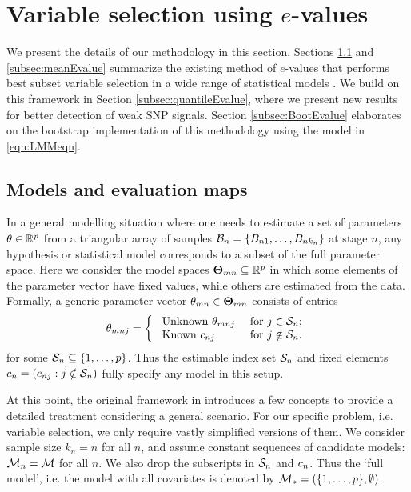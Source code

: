 \section{Variable selection using $e$-values}
\label{sec:methodsSection}
We present the details of our methodology in this section. Sections \ref{subsec:DefineModel} and \ref{subsec:meanEvalue} summarize the existing method of $e$-values that performs best subset variable selection in a wide range of statistical models \citep{MajumdarChatterjee17}. We build on this framework in Section \ref{subsec:quantileEvalue}, where we present new results for better detection of weak SNP signals. Section \ref{subsec:BootEvalue} elaborates on the bootstrap implementation of this methodology using the model in \eqref{eqn:LMMeqn}.

\subsection{Models and evaluation maps}
\label{subsec:DefineModel}
In a general modelling situation where one needs to estimate a set of parameters ${\theta} \in \mathbb{R}^p$ from a triangular array of samples $\mathcal{B}_n = \{ B_{n1}, \ldots, B_{n k_n} \}$ at stage $n$, any hypothesis or statistical model corresponds to a subset of the full parameter space. Here we consider the model spaces ${\boldsymbol{\Theta}}_{mn} \subseteq \mathbb{R}^{p}$ in which some elements of the parameter vector have fixed values, while others are estimated from the data. Formally, a generic parameter vector ${\theta}_{mn} \in {\boldsymbol{\Theta}}_{mn}$ consists of entries
%
$$
\theta_{m n j} = \left\{ \begin{array}{ll}
\text{ Unknown } \theta_{m n j} & \text{ for } 
			j \in \cS_{n}; \\
\text{ Known } c_{nj} & \text{ for } j \notin \cS_{n}.
\end{array}
\right.
$$
%
for some $\mathcal{S}_n \subseteq \{ 1, \ldots, p \}$. Thus the estimable index set $\mathcal{S}_n$ and fixed elements ${c}_n = (c_{n j} : j \notin \mathcal{S}_n)$ fully specify any model in this setup.

At this point, the original framework in \cite{MajumdarChatterjee17} introduces a few concepts to provide a detailed treatment considering a general scenario. For our specific problem, i.e. variable selection, we only require vastly simplified versions of them. We consider sample size $k_n = n$ for all $n$, and assume constant sequences of candidate models: $\mathcal{M}_n = \mathcal{M}$ for all $n$. We also drop the subscripts in $\mathcal{S}_n$ and ${c}_n$. Thus the `full model', i.e. the model with all covariates is denoted by $\mathcal{M}_* = (\{ 1, \ldots, p \}, \emptyset)$.

